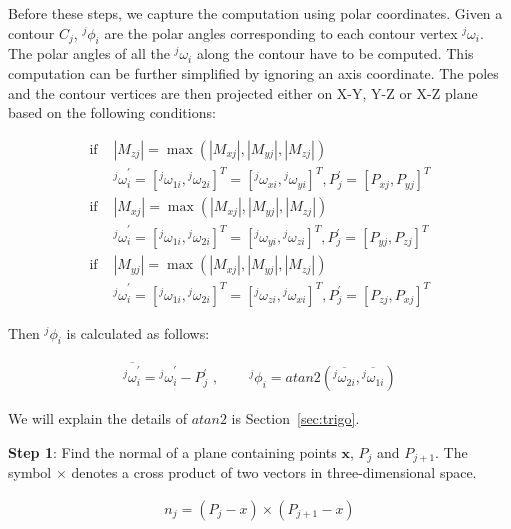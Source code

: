 Before these steps, we capture the computation using polar coordinates.
Given a contour $C_j$, $^j\phi_i$ are the polar angles corresponding to each contour vertex $^j\omega_i$.
The polar angles of all the $^j\omega_i$ along the contour have to be computed. 
This computation can be further simplified by ignoring an axis coordinate. 
The poles and the contour vertices are then projected either on X-Y, Y-Z or X-Z plane based on the following conditions:   

\begin{equation}
\begin{aligned}
\mbox{if } &|M_{zj}| = \max \left ( {|M_{xj}|,|M_{yj}|,|M_{zj}|} \right ) \\
&{^j\omega}^{\prime}_i = [{^j\omega}_{1i},{^j\omega}_{2i}]^T = [{^j\omega}_{xi},{^j\omega}_{yi}]^T, P^{\prime}_j=[P_{xj},P_{yj}]^T \\
\mbox{if } &|M_{xj}| = \max \left ( {|M_{xj}|,|M_{yj}|,|M_{zj}|} \right ) \\
&{^j\omega}^{\prime}_i = [{^j\omega}_{1i},{^j\omega}_{2i}]^T = [{^j\omega}_{yi},{^j\omega}_{zi}]^T, P^{\prime}_j=[P_{yj},P_{zj}]^T \\
\mbox{if } &|M_{yj}| = \max \left ( {|M_{xj}|,|M_{yj}|,|M_{zj}|} \right ) \\
&{^j\omega}^{\prime}_i = [{^j\omega}_{1i},{^j\omega}_{2i}]^T = [{^j\omega}_{zi},{^j\omega}_{xi}]^T, P^{\prime}_j=[P_{zj},P_{xj}]^T 
\end{aligned}
\label{eqt:preprocess1}
\end{equation}

Then ${^j\phi_i}$ is calculated as follows:

\begin{equation}
\begin{aligned}
\overline{{^j\omega}^{\prime}_i} = {^j\omega}^{\prime}_i - P^{\prime}_j \mbox{ , } \qquad
{^j\phi}_i = atan2 \left ( \overline{{^j\omega}_{2i}},\overline{{^j\omega}_{1i}} \right )
\end{aligned}
\label{eqt:preprocess2}
\end{equation}

We will explain the details of $atan2$ is Section~\ref{sec:trigo}.

\noindent \textbf{Step 1}:
Find the normal of a plane containing points $\boldsymbol{x}$, $P_j$ and $P_{j+1}$.
The symbol $\times$ denotes a cross product of two vectors in three-dimensional space.

\begin{equation}
\begin{aligned}
n_j = \left ( P_j-x \right ) \times \left ( P_{j+1}-x \right )
\end{aligned}
\label{eqt:normal}
\end{equation}

